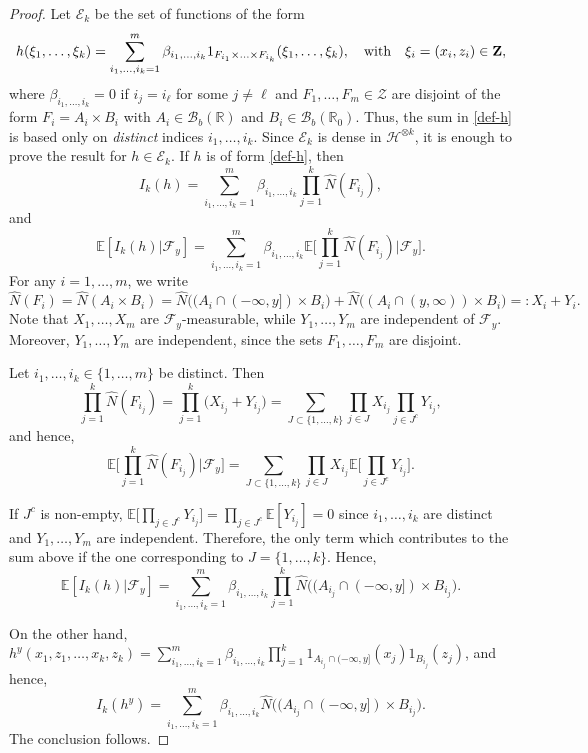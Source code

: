\documentclass[12pt]{article}
\def\cB{\mathcal{B}}
\def\cE{\mathcal{E}}
\def\cF{\mathcal{F}}
\def\cH{\mathcal{H}}
\def\cZ{\mathcal{Z}}
\def\bE{\mathbb{E}}
\def\bR{\mathbb{R}}
\begin{document}
\begin{proof}
Let $\cE_k$ be the set of functions of the form
\begin{equation}
\label{def-h}
h(\xi_1,\ldots,\xi_k)=\sum_{i_1,\ldots,i_k=1}^{m}\beta_{i_1,\ldots,i_k} 1_{F_{i_1}\times\ldots \times F_{i_k}}(\xi_1,\ldots,\xi_k), \quad \mbox{with} \quad \xi_i=(x_i,z_i) \in {\bf Z},
\end{equation}
where $\beta_{i_1,\ldots,i_k}=0$ if $i_j=i_{\ell}$ for some $j \not=\ell$ and $F_1,\ldots,F_m\in \cZ$ are disjoint of the form $F_i=A_i \times B_i$ with $A_i \in \cB_b(\bR)$ and $B_i \in \cB_b(\bR_0)$. Thus, the sum in \eqref{def-h} is based only on {\em distinct} indices $i_1,\ldots, i_k$.
Since $\cE_k$ is dense in $\cH^{\otimes k}$,
it is enough to prove the result for $h \in \cE_k$. If $h$ is of form \eqref{def-h}, then
\[
I_k(h)=\sum_{i_1,\ldots,i_k=1}^{m}  \beta_{i_1,\ldots,i_k} \prod_{j=1}^{k}\widehat{N}(F_{i_j}),
\]
and
\[
\bE[I_k(h)|\cF_y]=\sum_{i_1,\ldots,i_k=1}^{m}\beta_{i_1,\ldots,i_k}\bE \Big[\prod_{j=1}^{k} \widehat{N}(F_{i_j}) \big|\cF_y \Big].
\]
For any $i=1,\ldots,m$, we write
\[
\widehat{N}(F_i)=\widehat{N}(A_i \times B_i)=\widehat{N}\big((A_i \cap (-\infty,y]) \times B_i\big)+
\widehat{N}\big((A_i \cap (y,\infty))  \times B_i\big)=:X_i+Y_i.
\]
Note that $X_1,\ldots,X_m$ are $\cF_y$-measurable, while $Y_1,\ldots,Y_m$ are independent of $\cF_y$. Moreover, $Y_1,\ldots,Y_m$ are independent, since the sets $F_1,\ldots,F_m$ are disjoint. 

Let $i_1,\ldots,i_k\in \{1,\ldots,m\}$ be distinct. Then
\[
\prod_{j=1}^{k} \widehat{N}(F_{i_j})=\prod_{j=1}^{k} \big(X_{i_j}+Y_{i_j}\big)=\sum_{J \subset \{1,\ldots,k\}} \prod_{j\in J} X_{i_j} \prod_{j \in J^c} Y_{i_j},
\]
and hence,
\[
\bE\Big[\prod_{j=1}^{k} \widehat{N}(F_{i_j})\big|\cF_y\Big]=\sum_{J \subset \{1,\ldots,k\}} \prod_{j\in J} X_{i_j} \bE\Big[\prod_{j \in J^c} Y_{i_j}\Big].
\]

If $J^c$ is non-empty, $\bE\Big[\prod_{j \in J^c} Y_{i_j}\Big]=\prod_{j \in J^c}\bE[Y_{i_j}]=0$ since $i_1,\ldots, i_k$ are distinct and $Y_1,\ldots,Y_m$ are independent. Therefore, the only term which contributes to the sum above if the one corresponding to $J=\{1,\ldots,k\}$. Hence,
\[
\bE[I_k(h)|\cF_y]=\sum_{i_1,\ldots,i_k=1}^{m}\beta_{i_1,\ldots,i_k}\prod_{j=1}^{k}
\widehat{N}\big((A_{i_j} \cap (-\infty,y]) \times B_{i_j}\big).
\]

On the other hand, $h^y(x_1,z_1,\ldots,x_k,z_k)=\sum_{i_1,\ldots,i_k=1}^{m}\beta_{i_1,\ldots,i_k} 
\prod_{j=1}^{k}1_{A_{i_j} \cap (-\infty,y]}(x_j) 1_{B_{i_j}}(z_j)$,
and hence,
\[
I_k(h^y)=\sum_{i_1,\ldots,i_k=1}^{m}\beta_{i_1,\ldots,i_k}  \widehat{N}\big( (A_{i_j} \cap (-\infty,y]) \times B_{i_j} \big).
\]
The conclusion follows.
\end{proof}
\end{document}
